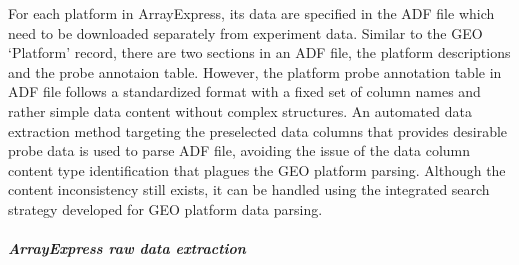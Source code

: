 For each platform in ArrayExpress, its data are specified in the ADF file
which need to be downloaded separately from experiment data.
%
Similar to the GEO `Platform' record, there are two sections in an ADF file,
the platform descriptions and the probe annotaion table.
%
However, the platform probe annotation table in ADF file follows a
standardized format with a fixed set of column names and rather simple
data content without complex structures.
%
An automated data extraction method targeting the preselected data
columns that provides desirable probe data is used to parse ADF file,
avoiding the issue of the data column content type identification that
plagues the GEO platform parsing.
%
Although the content inconsistency still exists, it can be handled using
the integrated search strategy developed for GEO platform data parsing.




\subparagraph{ArrayExpress raw data extraction}

% 
%
%

